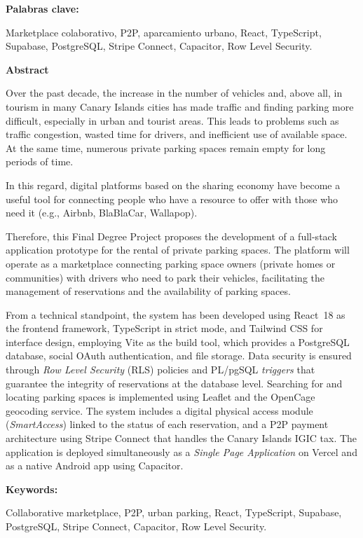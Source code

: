 \documentclass[a4paper,12pt,oneside]{scrbook}
\newenvironment{abstract}[1][\abstractname]{
    \cleardoublepageusingstyle{empty}
    \thispagestyle{empty}
    \begin{center}\textbf{#1}\end{center}
    \begin{itshape}\par\noindent%
}
{\end{itshape}}
\newenvironment{keywords}[1][Keywords]
{\vspace{7pt}\par\noindent\textup{\textbf{#1: }}\begin{upshape}}
{\end{upshape}}
\begin{document}
\begin{abstract}
    \begin{keywords}[Palabras clave]
        Marketplace colaborativo, P2P, aparcamiento urbano, React, TypeScript, Supabase, PostgreSQL, Stripe Connect, Capacitor, Row Level Security.
    \end{keywords}
\end{abstract}

\thispagestyle{empty}

\begin{abstract}[Abstract]
    Over the past decade, the increase in the number of vehicles and, above all, in tourism in many Canary Islands cities has made traffic and finding parking more difficult, especially in urban and tourist areas. This leads to problems such as traffic congestion, wasted time for drivers, and inefficient use of available space. At the same time, numerous private parking spaces remain empty for long periods of time.

    In this regard, digital platforms based on the sharing economy have become a useful tool for connecting people who have a resource to offer with those who need it (e.g., Airbnb, BlaBlaCar, Wallapop).

    Therefore, this Final Degree Project proposes the development of a full-stack application prototype for the rental of private parking spaces. The platform will operate as a marketplace connecting parking space owners (private homes or communities) with drivers who need to park their vehicles, facilitating the management of reservations and the availability of parking spaces.

    From a technical standpoint, the system has been developed using React~18 as the frontend framework, TypeScript in strict mode, and Tailwind CSS for interface design, employing Vite as the build tool, which provides a PostgreSQL database, social OAuth authentication, and file storage. Data security is ensured through \textit{Row Level Security} (RLS) policies and PL/pgSQL \textit{triggers} that guarantee the integrity of reservations at the database level. Searching for and locating parking spaces is implemented using Leaflet and the OpenCage geocoding service. The system includes a digital physical access module (\textit{SmartAccess}) linked to the status of each reservation, and a P2P payment architecture using Stripe Connect that handles the Canary Islands IGIC tax. The application is deployed simultaneously as a \textit{Single Page Application} on Vercel and as a native Android app using Capacitor.

    \begin{keywords}
        Collaborative marketplace, P2P, urban parking, React, TypeScript, Supabase, PostgreSQL, Stripe Connect, Capacitor, Row Level Security.
    \end{keywords}
\end{abstract}
\end{document}

